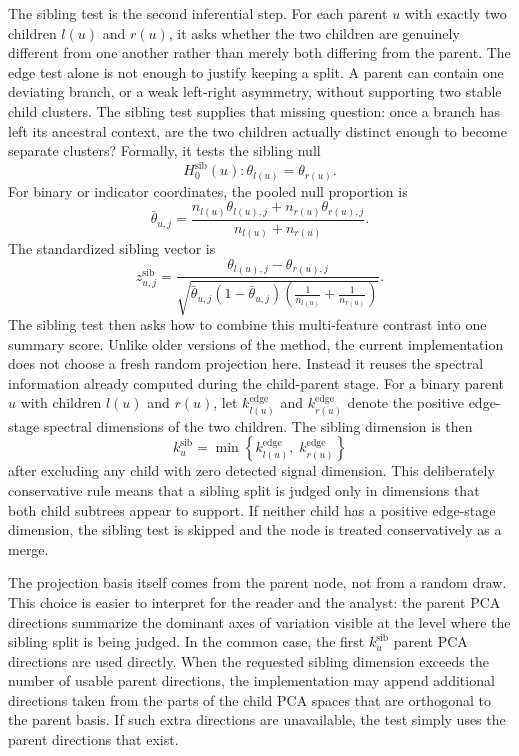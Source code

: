 The sibling test is the second inferential step. For each parent $u$ with
exactly two children $l(u)$ and $r(u)$, it asks whether the two children are
genuinely different from one another rather than merely both differing from the
parent. The edge test alone is not enough to justify keeping a split. A parent
can contain one deviating branch, or a weak left-right asymmetry, without
supporting two stable child clusters. The sibling test supplies that missing
question: once a branch has left its ancestral context, are the two children
actually distinct enough to become separate clusters?
Formally, it tests the sibling null
\begin{equation}
H_0^{\mathrm{sib}}(u): \theta_{l(u)} = \theta_{r(u)}.
\end{equation}
For binary or indicator coordinates, the pooled null proportion is
\begin{equation}
\bar{\theta}_{u,j}
=
\frac{n_{l(u)}\theta_{l(u),j} + n_{r(u)}\theta_{r(u),j}}
{n_{l(u)} + n_{r(u)}}.
\end{equation}
The standardized sibling vector is
\begin{equation}
z_{u,j}^{\mathrm{sib}}
=
\frac{\theta_{l(u),j} - \theta_{r(u),j}}
{\sqrt{
\bar{\theta}_{u,j}(1-\bar{\theta}_{u,j})
\left(\frac{1}{n_{l(u)}} + \frac{1}{n_{r(u)}}\right)
}}.
\end{equation}
The sibling test then asks how to combine this multi-feature contrast into one
summary score. Unlike older versions of the method, the current implementation
does not choose a fresh random projection here. Instead it reuses the spectral
information already computed during the child-parent stage. For a binary
parent $u$ with children $l(u)$ and
$r(u)$, let $k_{l(u)}^{\mathrm{edge}}$ and $k_{r(u)}^{\mathrm{edge}}$ denote
the positive edge-stage spectral dimensions of the two children. The sibling
dimension is then
\begin{equation}
k_u^{\mathrm{sib}}
=
\min\left\{
k_{l(u)}^{\mathrm{edge}},\; k_{r(u)}^{\mathrm{edge}}
\right\}
\end{equation}
after excluding any child with zero detected signal dimension. This
deliberately conservative rule means that a sibling split is judged only in
dimensions that both child subtrees appear to support. If neither child has a
positive edge-stage dimension, the sibling test is skipped and the node is
treated conservatively as a merge.

The projection basis itself comes from the parent node, not from a random draw.
This choice is easier to interpret for the reader and the analyst: the parent
PCA directions summarize the dominant axes of variation visible at the level
where the sibling split is being judged. In the common case, the first
$k_u^{\mathrm{sib}}$ parent PCA directions are used directly. When the
requested sibling dimension exceeds the number of usable parent directions, the
implementation may append additional directions taken from the parts of the
child PCA spaces that are orthogonal to the parent basis. If such extra
directions are unavailable, the test simply uses the parent directions that
exist.

